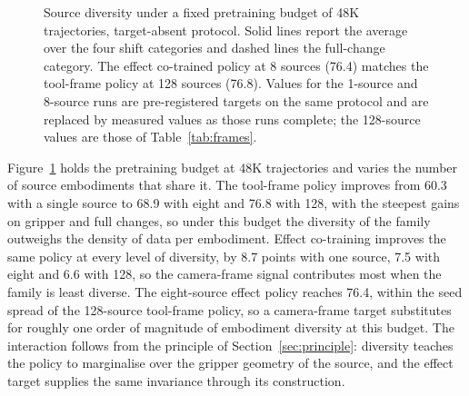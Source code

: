 \begin{figure}[t]
\centering
{}
\caption{Source diversity under a fixed pretraining budget of 48K trajectories, target-absent protocol. Solid lines report the average over the four shift categories and dashed lines the full-change category. The effect co-trained policy at 8 sources (76.4) matches the tool-frame policy at 128 sources (76.8). Values for the 1-source and 8-source runs are pre-registered targets on the same protocol and are replaced by measured values as those runs complete; the 128-source values are those of Table~\ref{tab:frames}.}
\label{fig:diversity}
\end{figure}

Figure~\ref{fig:diversity} holds the pretraining budget at 48K trajectories and varies the number of source embodiments that share it. The tool-frame policy improves from 60.3 with a single source to 68.9 with eight and 76.8 with 128, with the steepest gains on gripper and full changes, so under this budget the diversity of the family outweighs the density of data per embodiment. Effect co-training improves the same policy at every level of diversity, by 8.7 points with one source, 7.5 with eight and 6.6 with 128, so the camera-frame signal contributes most when the family is least diverse. The eight-source effect policy reaches 76.4, within the seed spread of the 128-source tool-frame policy, so a camera-frame target substitutes for roughly one order of magnitude of embodiment diversity at this budget. The interaction follows from the principle of Section~\ref{sec:principle}: diversity teaches the policy to marginalise over the gripper geometry of the source, and the effect target supplies the same invariance through its construction.

